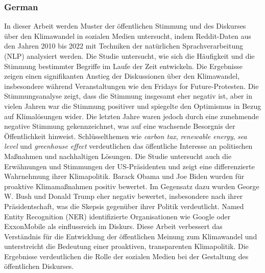 \subsubsection{German}
In dieser Arbeit werden Muster der öffentlichen Stimmung und des Diskurses über den Klimawandel in sozialen Medien untersucht, indem Reddit-Daten aus den Jahren 2010 bis 2022 mit Techniken der natürlichen Sprachverarbeitung (NLP) analysiert werden. Die Studie untersucht, wie sich die Häufigkeit und die Stimmung bestimmter Begriffe im Laufe der Zeit entwickeln. Die Ergebnisse zeigen einen signifikanten Anstieg der Diskussionen über den Klimawandel, insbesondere während Veranstaltungen wie den Fridays for Future-Protesten. Die Stimmungsanalyse zeigt, dass die Stimmung insgesamt eher negativ ist, aber in vielen Jahren war die Stimmung positiver und spiegelte den Optimismus in Bezug auf Klimalösungen wider. Die letzten Jahre waren jedoch durch eine zunehmende negative Stimmung gekennzeichnet, was auf eine wachsende Besorgnis der Öffentlichkeit hinweist.
Schlüsselthemen wie \emph{carbon tax}, \emph{renewable energy}, \emph{sea level} und \emph{greenhouse effect} verdeutlichen das öffentliche Interesse an politischen Maßnahmen und nachhaltigen Lösungen. Die Studie untersucht auch die Erwähnungen und Stimmungen der US-Präsidenten und zeigt eine differenzierte Wahrnehmung ihrer Klimapolitik. Barack Obama und Joe Biden wurden für proaktive Klimamaßnahmen positiv bewertet. Im Gegensatz dazu wurden George W. Bush und Donald Trump eher negativ bewertet, insbesondere nach ihrer Präsidentschaft, was die Skepsis gegenüber ihrer Politik verdeutlicht. Named Entity Recognition (NER) identifizierte Organisationen wie Google oder ExxonMobile als einflussreich im Diskurs.
Diese Arbeit verbessert das Verständnis für die Entwicklung der öffentlichen Meinung zum Klimawandel und unterstreicht die Bedeutung einer proaktiven, transparenten Klimapolitik. Die Ergebnisse verdeutlichen die Rolle der sozialen Medien bei der Gestaltung des öffentlichen Diskurses.
